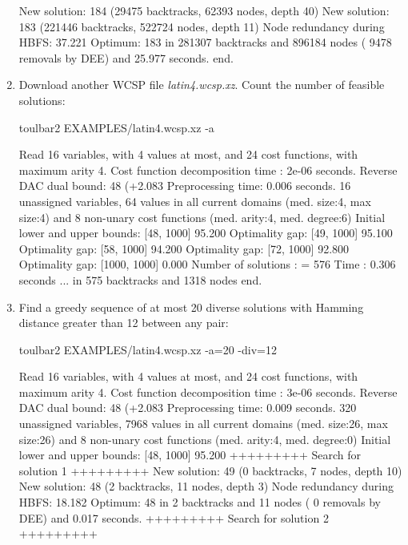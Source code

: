 \begin{enumerate}
{\begin{DoxyCode}
New solution: 184 (29475 backtracks, 62393 nodes, depth 40)
New solution: 183 (221446 backtracks, 522724 nodes, depth 11)
Node redundancy during HBFS: 37.221 %
Optimum: 183 in 281307 backtracks and 896184 nodes ( 9478 removals by DEE) and 25.977 seconds.
end.
\end{DoxyCode}}
\item Download another WCSP file {\em latin4.wcsp.xz}. Count the number of feasible solutions:
\begin{DoxyCode}
	toulbar2 EXAMPLES/latin4.wcsp.xz -a
\end{DoxyCode}
{\scriptsize
\begin{DoxyCode}
Read 16 variables, with 4 values at most, and 24 cost functions, with maximum arity 4.
Cost function decomposition time : 2e-06 seconds.
Reverse DAC dual bound: 48 (+2.083%
Preprocessing time: 0.006 seconds.
16 unassigned variables, 64 values in all current domains (med. size:4, max size:4) and 8 non-unary cost functions (med. arity:4, med. degree:6)
Initial lower and upper bounds: [48, 1000] 95.200%
Optimality gap: [49, 1000] 95.100 %
Optimality gap: [58, 1000] 94.200 %
Optimality gap: [72, 1000] 92.800 %
Optimality gap: [1000, 1000] 0.000 %
Number of solutions    : =  576
Time                   :    0.306 seconds
... in 575 backtracks and 1318 nodes
end.
\end{DoxyCode}}
\item Find a greedy sequence of at most 20 diverse solutions with Hamming distance greater than 12 between any pair:
\begin{DoxyCode}
	toulbar2 EXAMPLES/latin4.wcsp.xz -a=20 -div=12
\end{DoxyCode}
{\scriptsize
\begin{DoxyCode}
Read 16 variables, with 4 values at most, and 24 cost functions, with maximum arity 4.
Cost function decomposition time : 3e-06 seconds.
Reverse DAC dual bound: 48 (+2.083%
Preprocessing time: 0.009 seconds.
320 unassigned variables, 7968 values in all current domains (med. size:26, max size:26) and 8 non-unary cost functions (med. arity:4, med. degree:0)
Initial lower and upper bounds: [48, 1000] 95.200%
+++++++++ Search for solution 1 +++++++++
New solution: 49 (0 backtracks, 7 nodes, depth 10)
New solution: 48 (2 backtracks, 11 nodes, depth 3)
Node redundancy during HBFS: 18.182 %
Optimum: 48 in 2 backtracks and 11 nodes ( 0 removals by DEE) and 0.017 seconds.
+++++++++ Search for solution 2 +++++++++

\end{DoxyCode}}
\end{enumerate}
